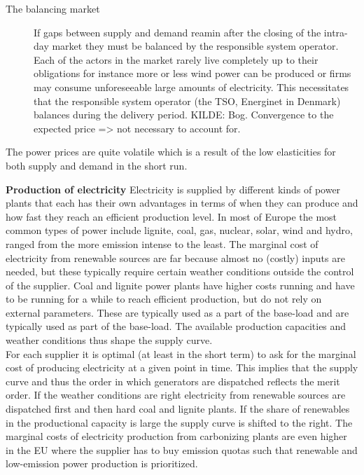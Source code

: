\begin{description}
    \item [The balancing market]
    If gaps between supply and demand reamin after the closing of the intra-day market they must be balanced by the responsible system operator. Each of the actors in the market rarely live completely up to their obligations for instance more or less wind power can be produced or firms may consume unforeseeable large amounts of electricity. This necessitates that the responsible system operator (the TSO, Energinet in Denmark) balances during the delivery period. KILDE: Bog.  Convergence to the expected price => not necessary to account for. 
    
\end{description}

The power prices are quite volatile which is a result of the low elasticities for both supply and demand in the short run.

\textbf{Production of electricity}
Electricity is supplied by different kinds of power plants that each has their own advantages in terms of when they can produce and how fast they reach an efficient production level. In most of Europe the most common types of power include lignite, coal, gas, nuclear, solar, wind and hydro, ranged from the more emission intense to the least. The marginal cost of electricity from renewable sources are far because almost no (costly) inputs are needed, but these typically require certain weather conditions outside the control of the supplier. Coal and lignite power plants have higher costs running and have to be running for a while to reach efficient production, but do not rely on external parameters. These are typically used as a part of the base-load  and are typically used as part of the base-load. The available production capacities and weather conditions thus shape the supply curve. \smallskip \\

For each supplier it is optimal (at least in the short term) to ask for the marginal cost of producing electricity at a given point in time. This implies that the supply curve and thus the order in which generators are dispatched reflects the merit order. If the weather conditions are right electricity from renewable sources are dispatched first and then hard coal and lignite plants. If the share of renewables in the productional capacity is large the supply curve is shifted to the right. The marginal costs of electricity production from carbonizing plants are even higher in the EU where the supplier has to buy emission quotas such that renewable and low-emission power production is prioritized. \smallskip \\

